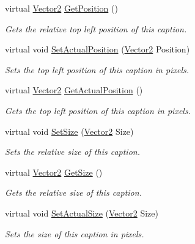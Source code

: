 \begin{DoxyCompactItemize}
virtual \hyperlink{classphys_1_1Vector2}{Vector2} \hyperlink{classphys_1_1UI_1_1Caption_a3096383b16f81c3b4894afd61110ffa0}{GetPosition} ()
\begin{DoxyCompactList}\small\item\em Gets the relative top left position of this caption. \item\end{DoxyCompactList}\item 
virtual void \hyperlink{classphys_1_1UI_1_1Caption_aa7cae65db2e068c47d42a0d12e259528}{SetActualPosition} (\hyperlink{classphys_1_1Vector2}{Vector2} Position)
\begin{DoxyCompactList}\small\item\em Sets the top left position of this caption in pixels. \item\end{DoxyCompactList}\item 
virtual \hyperlink{classphys_1_1Vector2}{Vector2} \hyperlink{classphys_1_1UI_1_1Caption_aae3e6728a26111e12b081992d6d04e1a}{GetActualPosition} ()
\begin{DoxyCompactList}\small\item\em Gets the top left position of this caption in pixels. \item\end{DoxyCompactList}\item 
virtual void \hyperlink{classphys_1_1UI_1_1Caption_a7a0ae7b6b82a9c0fba6c9a7ffb6d991b}{SetSize} (\hyperlink{classphys_1_1Vector2}{Vector2} Size)
\begin{DoxyCompactList}\small\item\em Sets the relative size of this caption. \item\end{DoxyCompactList}\item 
virtual \hyperlink{classphys_1_1Vector2}{Vector2} \hyperlink{classphys_1_1UI_1_1Caption_a1da2e0e9ce0d904595f53a10244fcaf4}{GetSize} ()
\begin{DoxyCompactList}\small\item\em Gets the relative size of this caption. \item\end{DoxyCompactList}\item 
virtual void \hyperlink{classphys_1_1UI_1_1Caption_a682a5d8b32d5382cbaba73bfe73128e3}{SetActualSize} (\hyperlink{classphys_1_1Vector2}{Vector2} Size)
\begin{DoxyCompactList}\small\item\em Sets the size of this caption in pixels. \item\end{DoxyCompactList}\item 

\end{DoxyCompactItemize}
